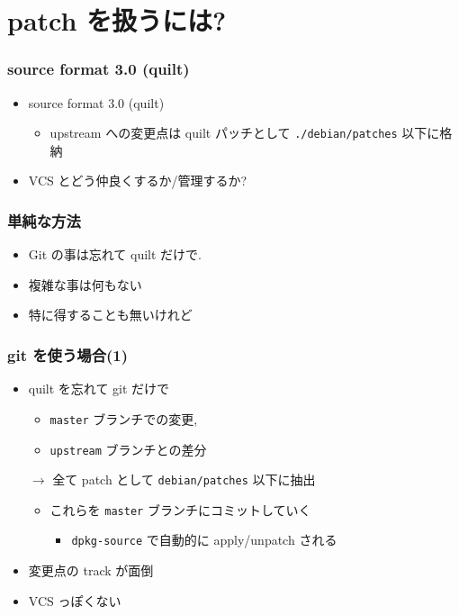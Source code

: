 \documentclass[10pt,final,c,dvipdfmx,cjk,colorlinks=false]{beamer}
\begin{document}
\section{patch を扱うには?}
\label{sec-4}
\begin{frame}
\frametitle{source format 3.0 (quilt)}
\label{sec-4-1}


\begin{itemize}
\item source format 3.0 (quilt)
\begin{itemize}
\item upstream への変更点は quilt パッチとして
    \texttt{./debian/patches} 以下に格納
\end{itemize}
\item VCS とどう仲良くするか/管理するか?
\end{itemize}
\end{frame}
\begin{frame}
\frametitle{単純な方法}
\label{sec-4-2}


\begin{itemize}
\item Git の事は忘れて quilt だけで.
\item 複雑な事は何もない
\item 特に得することも無いけれど
\end{itemize}
\end{frame}
\begin{frame}
\frametitle{git を使う場合(1)}
\label{sec-4-3}


\begin{itemize}
\item quilt を忘れて git だけで
\begin{itemize}
\item \texttt{master} ブランチでの変更,
\item \texttt{upstream} ブランチとの差分 \newline
\end{itemize}
$\to$ 全て patch として \texttt{debian/patches} 以下に抽出
\begin{itemize}
\item これらを \texttt{master} ブランチにコミットしていく
\begin{itemize}
\item \texttt{dpkg-source} で自動的に apply/unpatch される
\end{itemize}
\end{itemize}
\item 変更点の track が面倒
\item VCS っぽくない
\end{itemize}
\end{frame}
\end{document}
